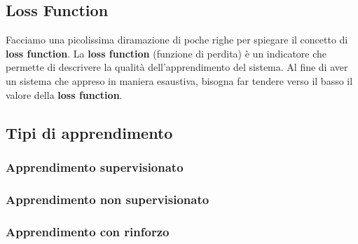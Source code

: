 \subsection{Loss Function}
Facciamo una picolissima diramazione di poche righe per spiegare 
%
il concetto di \textbf{loss function}.
{
    La \textbf{loss function} (funzione di perdita) è un indicatore
%
    che permette di descrivere la  qualità dell'apprendimento del 
%
    sistema.
}
Al fine di aver un sistema che appreso in maniera esaustiva, 
%
bisogna far tendere verso il basso il valore della \textbf{loss 
%
function}.
\subsection{Tipi di apprendimento}
\subsubsection{Apprendimento supervisionato}
\subsubsection{Apprendimento non supervisionato}
\subsubsection{Apprendimento con rinforzo}

 